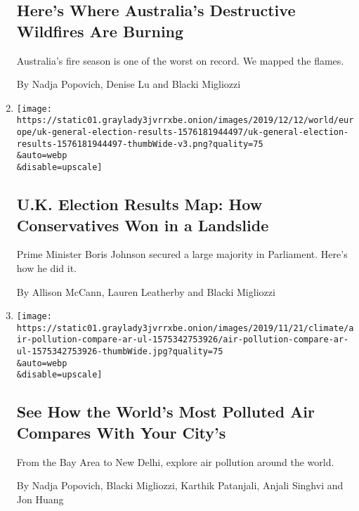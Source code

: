 \begin{enumerate}
  \hypertarget{heres-where-australias-destructive-wildfires-are-burning}{%
  \subsection{Here's Where Australia's Destructive Wildfires Are
  Burning}\label{heres-where-australias-destructive-wildfires-are-burning}}

  Australia's fire season is one of the worst on record. We mapped the
  flames.

  By Nadja Popovich, Denise Lu and Blacki Migliozzi
\item
  \href{/interactive/2019/12/13/world/europe/uk-general-election-results.html}{}

  \texttt{[image: https://static01.graylady3jvrrxbe.onion/images/2019/12/12/world/europe/uk-general-election-results-1576181944497/uk-general-election-results-1576181944497-thumbWide-v3.png?quality=75\\\&auto=webp\\\&disable=upscale]}

  \hypertarget{uk-election-results-map-how-conservatives-won-in-a-landslide}{%
  \subsection{U.K. Election Results Map: How Conservatives Won in a
  Landslide}\label{uk-election-results-map-how-conservatives-won-in-a-landslide}}

  Prime Minister Boris Johnson secured a large majority in Parliament.
  Here's how he did it.

  By Allison McCann, Lauren Leatherby and Blacki Migliozzi
\item
  \href{/interactive/2019/12/02/climate/air-pollution-compare-ar-ul.html}{}

  \texttt{[image: https://static01.graylady3jvrrxbe.onion/images/2019/11/21/climate/air-pollution-compare-ar-ul-1575342753926/air-pollution-compare-ar-ul-1575342753926-thumbWide.jpg?quality=75\\\&auto=webp\\\&disable=upscale]}

  \hypertarget{see-how-the-worlds-most-polluted-air-compares-with-your-citys}{%
  \subsection{See How the World's Most Polluted Air Compares With Your
  City's}\label{see-how-the-worlds-most-polluted-air-compares-with-your-citys}}

  From the Bay Area to New Delhi, explore air pollution around the
  world.

  By Nadja Popovich, Blacki Migliozzi, Karthik Patanjali, Anjali Singhvi
  and Jon Huang
\end{enumerate}

